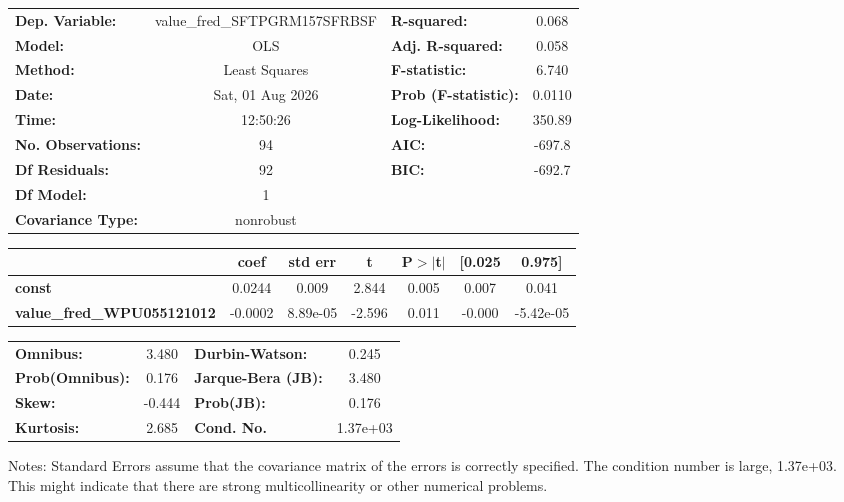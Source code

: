 \begin{center}
\begin{tabular}{lclc}
\toprule
\textbf{Dep. Variable:}            & value\_fred\_SFTPGRM157SFRBSF & \textbf{  R-squared:         } &     0.068   \\
\textbf{Model:}                    &              OLS              & \textbf{  Adj. R-squared:    } &     0.058   \\
\textbf{Method:}                   &         Least Squares         & \textbf{  F-statistic:       } &     6.740   \\
\textbf{Date:}                     &        Sat, 01 Aug 2026       & \textbf{  Prob (F-statistic):} &   0.0110    \\
\textbf{Time:}                     &            12:50:26           & \textbf{  Log-Likelihood:    } &    350.89   \\
\textbf{No. Observations:}         &                 94            & \textbf{  AIC:               } &    -697.8   \\
\textbf{Df Residuals:}             &                 92            & \textbf{  BIC:               } &    -692.7   \\
\textbf{Df Model:}                 &                  1            & \textbf{                     } &             \\
\textbf{Covariance Type:}          &           nonrobust           & \textbf{                     } &             \\
\bottomrule
\end{tabular}
\begin{tabular}{lcccccc}
                                   & \textbf{coef} & \textbf{std err} & \textbf{t} & \textbf{P$> |$t$|$} & \textbf{[0.025} & \textbf{0.975]}  \\
\midrule
\textbf{const}                     &       0.0244  &        0.009     &     2.844  &         0.005        &        0.007    &        0.041     \\
\textbf{value\_fred\_WPU055121012} &      -0.0002  &     8.89e-05     &    -2.596  &         0.011        &       -0.000    &    -5.42e-05     \\
\bottomrule
\end{tabular}
\begin{tabular}{lclc}
\textbf{Omnibus:}       &  3.480 & \textbf{  Durbin-Watson:     } &    0.245  \\
\textbf{Prob(Omnibus):} &  0.176 & \textbf{  Jarque-Bera (JB):  } &    3.480  \\
\textbf{Skew:}          & -0.444 & \textbf{  Prob(JB):          } &    0.176  \\
\textbf{Kurtosis:}      &  2.685 & \textbf{  Cond. No.          } & 1.37e+03  \\
\bottomrule
\end{tabular}
\end{center}

Notes: \newline
 [1] Standard Errors assume that the covariance matrix of the errors is correctly specified. \newline
 [2] The condition number is large, 1.37e+03. This might indicate that there are \newline
 strong multicollinearity or other numerical problems.